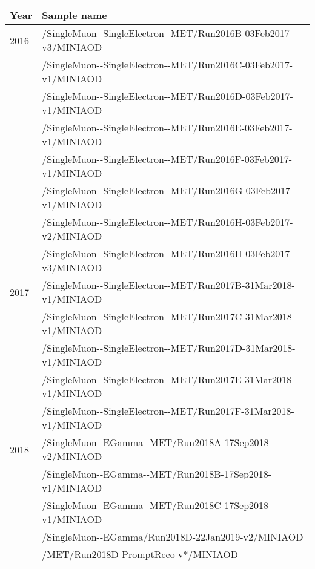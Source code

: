\scriptsize
\begin{tabular}{l|l}
  \hline
  Year & Sample name\\
  \hline
  \hline
  2016 & \ttfamily /SingleMuon-{}-SingleElectron-{}-MET/Run2016B-03Feb2017-v3/MINIAOD\\
  & \ttfamily /SingleMuon-{}-SingleElectron-{}-MET/Run2016C-03Feb2017-v1/MINIAOD \\
  & \ttfamily /SingleMuon-{}-SingleElectron-{}-MET/Run2016D-03Feb2017-v1/MINIAOD \\
  & \ttfamily /SingleMuon-{}-SingleElectron-{}-MET/Run2016E-03Feb2017-v1/MINIAOD \\
  & \ttfamily /SingleMuon-{}-SingleElectron-{}-MET/Run2016F-03Feb2017-v1/MINIAOD \\
  & \ttfamily /SingleMuon-{}-SingleElectron-{}-MET/Run2016G-03Feb2017-v1/MINIAOD \\
  & \ttfamily /SingleMuon-{}-SingleElectron-{}-MET/Run2016H-03Feb2017-v2/MINIAOD \\
  & \ttfamily /SingleMuon-{}-SingleElectron-{}-MET/Run2016H-03Feb2017-v3/MINIAOD \\
  \hline
  2017 & \ttfamily /SingleMuon-{}-SingleElectron-{}-MET/Run2017B-31Mar2018-v1/MINIAOD \\
  & \ttfamily /SingleMuon-{}-SingleElectron-{}-MET/Run2017C-31Mar2018-v1/MINIAOD \\
  & \ttfamily /SingleMuon-{}-SingleElectron-{}-MET/Run2017D-31Mar2018-v1/MINIAOD \\
  & \ttfamily /SingleMuon-{}-SingleElectron-{}-MET/Run2017E-31Mar2018-v1/MINIAOD \\
  & \ttfamily /SingleMuon-{}-SingleElectron-{}-MET/Run2017F-31Mar2018-v1/MINIAOD \\
  \hline
  2018 & \ttfamily /SingleMuon-{}-EGamma-{}-MET/Run2018A-17Sep2018-v2/MINIAOD \\
  & \ttfamily /SingleMuon-{}-EGamma-{}-MET/Run2018B-17Sep2018-v1/MINIAOD \\
  & \ttfamily /SingleMuon-{}-EGamma-{}-MET/Run2018C-17Sep2018-v1/MINIAOD \\
  & \ttfamily /SingleMuon-{}-EGamma/Run2018D-22Jan2019-v2/MINIAOD \\
  & \ttfamily /MET/Run2018D-PromptReco-v*/MINIAOD \\
  \hline
\end{tabular}
